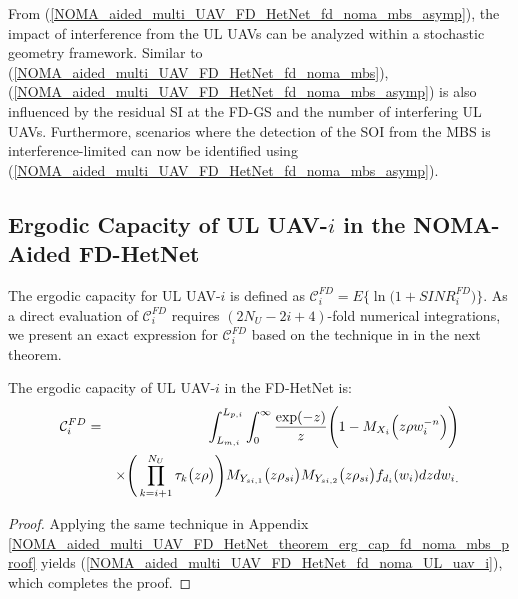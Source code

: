 From (\ref{NOMA_aided_multi_UAV_FD_HetNet_fd_noma_mbs_asymp}), the impact of interference from the UL UAVs can be analyzed within a stochastic geometry framework. Similar to (\ref{NOMA_aided_multi_UAV_FD_HetNet_fd_noma_mbs}), (\ref{NOMA_aided_multi_UAV_FD_HetNet_fd_noma_mbs_asymp}) is also influenced by the residual SI at the FD-GS and the number of interfering UL UAVs. Furthermore, scenarios where the detection of the SOI from the MBS is interference-limited can now be identified using (\ref{NOMA_aided_multi_UAV_FD_HetNet_fd_noma_mbs_asymp}).

\subsection{Ergodic Capacity of UL UAV-$i$ in the NOMA-Aided FD-HetNet}

The ergodic capacity for UL UAV-$i$ is defined as $\mathcal{C}_{i}^{FD} = E\Big\{\ln\Big(1+SINR_{i}^{FD}\Big)\Big\}$. As a direct evaluation of $\mathcal{C}_{i}^{FD}$ requires $(2N_U - 2i + 4)$-fold numerical integrations, we present an exact expression for $\mathcal{C}_{i}^{FD}$ based on the technique in \cite{hamdi2010useful} in the next theorem.

\begin{theorem} \label{NOMA_aided_multi_UAV_FD_HetNet_theorem_erg_cap_UL_uav_i}
The ergodic capacity of UL UAV-$i$ in the FD-HetNet is:
\begin{eqnarray} \label{NOMA_aided_multi_UAV_FD_HetNet_fd_noma_UL_uav_i}
\mathcal{C}_{i}^{FD} & \hspace{-0.0cm} = & \hspace{-0.0cm} \int_{L_{m,i}}^{L_{p,i}} \int_{0}^{\infty} \frac{\exp(-z)}{z} \Bigg(1-M_{X_{i}}\Big(z\rho  w_{i}^{-n}\Big)\Bigg) \nonumber \\
 & & \hspace{0cm} \times \Bigg( \prod_{k=i+1}^{N_U} \tau_k\big(z\rho\big) \Bigg) M_{Y_{si,1}}\big(z\rho_{si}\big) M_{Y_{si,2}}\big(z\rho_{si}\big) f_{d_{i}}(w_{i}) {dz dw_{i}}_.
\end{eqnarray}
\end{theorem}
\begin{proof}
Applying the same technique in Appendix \ref{NOMA_aided_multi_UAV_FD_HetNet_theorem_erg_cap_fd_noma_mbs_proof} yields (\ref{NOMA_aided_multi_UAV_FD_HetNet_fd_noma_UL_uav_i}), which completes the proof.
\end{proof}

